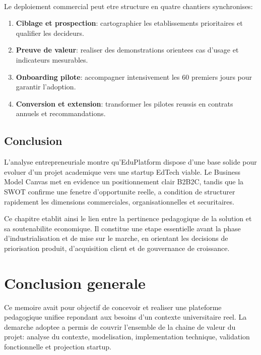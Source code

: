 ﻿﻿\documentclass[12pt,a4paper,oneside]{report}
\begin{document}
Le deploiement commercial peut etre structure en quatre chantiers synchronises:
\begin{enumerate}
  \item \textbf{Ciblage et prospection}: cartographier les etablissements prioritaires et qualifier les decideurs.
  \item \textbf{Preuve de valeur}: realiser des demonstrations orientees cas d'usage et indicateurs mesurables.
  \item \textbf{Onboarding pilote}: accompagner intensivement les 60 premiers jours pour garantir l'adoption.
  \item \textbf{Conversion et extension}: transformer les pilotes reussis en contrats annuels et recommandations.
\end{enumerate}

\section{Conclusion}

L'analyse entrepreneuriale montre qu'EduPlatform dispose d'une base solide pour evoluer d'un projet academique vers une startup EdTech viable. Le Business Model Canvas met en evidence un positionnement clair B2B2C, tandis que la SWOT confirme une fenetre d'opportunite reelle, a condition de structurer rapidement les dimensions commerciales, organisationnelles et securitaires.

Ce chapitre etablit ainsi le lien entre la pertinence pedagogique de la solution et sa soutenabilite economique. Il constitue une etape essentielle avant la phase d'industrialisation et de mise sur le marche, en orientant les decisions de priorisation produit, d'acquisition client et de gouvernance de croissance.


\chapter*{Conclusion generale}

Ce memoire avait pour objectif de concevoir et realiser une plateforme pedagogique unifiee repondant aux besoins d'un contexte universitaire reel. La demarche adoptee a permis de couvrir l'ensemble de la chaine de valeur du projet: analyse du contexte, modelisation, implementation technique, validation fonctionnelle et projection startup.
\end{document}
